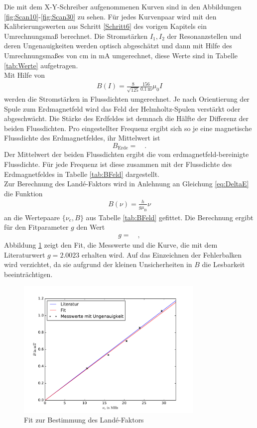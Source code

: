 Die mit dem X-Y-Schreiber aufgenommenen Kurven sind in den Abbildungen \ref{fig:Scan10}-\ref{fig:Scan30} zu sehen. Für jedes Kurvenpaar wird mit den Kalibrierungswerten aus Schritt \ref{Schritt6} des vorigen Kapitels ein Umrechnungsmaß berechnet. Die Stromstärken $I_1,I_2$ der Resonanzstellen und deren Ungenauigkeiten werden optisch abgeschätzt und dann mit Hilfe des Umrechnungsmaßes von \si{\centi\meter} in \si{\milli\ampere} umgerechnet, diese Werte sind in Tabelle \ref{tab:Werte} aufgetragen.
 \\
Mit Hilfe von
\begin{align}
	B(I) = \frac{8}{\sqrt{125}}\frac{156}{\SI{0.1}{\meter}}\mu_0I
\end{align}
werden die Stromstärken in Flussdichten umgerechnet. Je nach Orientierung der Spule zum Erdmagnetfeld wird das Feld der Helmholtz-Spulen verstärkt oder abgeschwächt. Die Stärke des Erdfeldes ist demnach die Hälfte der Differenz der beiden Flussdichten. Pro eingestellter Frequenz ergibt sich so je eine magnetische Flussdichte des Erdmagnetfeldes, ihr Mittelwert ist
\[ B_\text{Erde} =  \quad. \]
Der Mittelwert der beiden Flussdichten ergibt die vom erdmagnetfeld-bereinigte Flussdichte. Für jede Frequenz ist diese zusammen mit der Flussdichte des Erdmagnetfeldes in Tabelle \ref{tab:BFeld} dargestellt.
 \\
\clearpage
Zur Berechnung des Landé-Faktors wird in Anlehnung an Gleichung \eqref{eq:DeltaE} die Funktion
\begin{align*}
	B(\nu) = \frac{h}{g\mu_\text{B}}\nu
\end{align*}
an die Wertepaare $\{\nu_e,B\}$ aus Tabelle \ref{tab:BFeld} gefittet. Die Berechnung ergibt für den Fitparameter $g$ den Wert
\begin{align*}
	g =  \quad,
\end{align*}
Abbildung \ref{fig:fit} zeigt den Fit, die Messwerte und die Kurve, die mit dem Literaturwert $g = 2.0023$ \cite{gFaktor} erhalten wird. Auf das Einzeichnen der Fehlerbalken wird verzichtet, da sie aufgrund der kleinen Unsicherheiten in $B$ die Lesbarkeit beeinträchtigen.
\begin{figure}[h!]
	\centering
	\includegraphics[width=0.8\textwidth]{Fit.pdf}
	\caption{Fit zur Bestimmung des Landé-Faktors}
	\label{fig:fit}
\end{figure}
